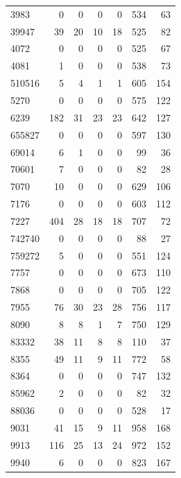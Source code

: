 \begin{longtable}{lrrrrrr}
3983 & 0 & 0 & 0 & 0 & 534 & 63 \\
39947 & 39 & 20 & 10 & 18 & 525 & 82 \\
4072 & 0 & 0 & 0 & 0 & 525 & 67 \\
4081 & 1 & 0 & 0 & 0 & 538 & 73 \\
510516 & 5 & 4 & 1 & 1 & 605 & 154 \\
5270 & 0 & 0 & 0 & 0 & 575 & 122 \\
6239 & 182 & 31 & 23 & 23 & 642 & 127 \\
655827 & 0 & 0 & 0 & 0 & 597 & 130 \\
69014 & 6 & 1 & 0 & 0 & 99 & 36 \\
70601 & 7 & 0 & 0 & 0 & 82 & 28 \\
7070 & 10 & 0 & 0 & 0 & 629 & 106 \\
7176 & 0 & 0 & 0 & 0 & 603 & 112 \\
7227 & 404 & 28 & 18 & 18 & 707 & 72 \\
742740 & 0 & 0 & 0 & 0 & 88 & 27 \\
759272 & 5 & 0 & 0 & 0 & 551 & 124 \\
7757 & 0 & 0 & 0 & 0 & 673 & 110 \\
7868 & 0 & 0 & 0 & 0 & 705 & 122 \\
7955 & 76 & 30 & 23 & 28 & 756 & 117 \\
8090 & 8 & 8 & 1 & 7 & 750 & 129 \\
83332 & 38 & 11 & 8 & 8 & 110 & 37 \\
8355 & 49 & 11 & 9 & 11 & 772 & 58 \\
8364 & 0 & 0 & 0 & 0 & 747 & 132 \\
85962 & 2 & 0 & 0 & 0 & 82 & 32 \\
88036 & 0 & 0 & 0 & 0 & 528 & 17 \\
9031 & 41 & 15 & 9 & 11 & 958 & 168 \\
9913 & 116 & 25 & 13 & 24 & 972 & 152 \\
9940 & 6 & 0 & 0 & 0 & 823 & 167 \\
\bottomrule
\end{longtable}
\endgroup

